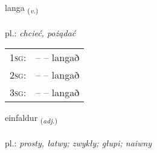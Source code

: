 \documentclass[frontgrid, backgrid]{flacards}\usepackage[]{graphicx}\usepackage[]{xcolor}
\begin{document}
\renewcommand{\flhead}{\vskip5pt \fboxsep=0pt {\small\bfseries\footnotesize Sagnorð | czasownik}}
\renewcommand{\fcfoot}{\vskip5pt \fboxsep=0pt \hspace{2pt}{\small\bfseries\footnotesize 1K}}

\renewcommand{\blhead}{\vskip5pt {\small\bfseries\footnotesize Sagnorð | czasownik }}
\renewcommand{\bcfoot}{\vskip5pt \hspace{2pt}{\small\bfseries\footnotesize 1K}}


{langa \small{\textsubscript{(\textit{v.})}} \\[1ex] %
\textphonetic{[lauŋka]} \\
pl.: \emph{chcieć, pożądać} \\  [2ex]
\renewcommand*{\arraystretch}{0.8}
\begin{tabular}{p{1cm}l}
\textsc{1sg}: &  --  -- langað \\ 
\textsc{2sg}: &  --  -- langað \\ 
\textsc{3sg}: &  --  -- langað \\ 
\end{tabular}
}

\renewcommand{\flhead}{\vskip5pt \fboxsep=0pt {\small\bfseries\footnotesize Lýsingarorð | przymiotnik}}
\renewcommand{\fcfoot}{\vskip5pt \fboxsep=0pt \hspace{2pt}{\small\bfseries\footnotesize 1K}}

\renewcommand{\blhead}{\vskip5pt {\small\bfseries\footnotesize Lýsingarorð | przymiotnik }}
\renewcommand{\bcfoot}{\vskip5pt \hspace{2pt}{\small\bfseries\footnotesize 1K}}


{einfaldur \small{\textsubscript{(\textit{adj.})}} \\[1ex] %
\textphonetic{[einfaltʏr]} \\
pl.: \emph{prosty, łatwy; zwykły; głupi; naiwny} \\  [2ex]
\renewcommand*{\arraystretch}{0.8}
}
\end{document}
